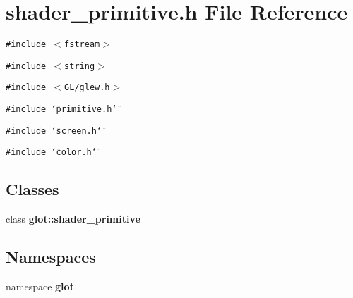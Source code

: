 \section{shader\_\-primitive.h File Reference}
\label{shader__primitive_8h}
{\tt \#include $<$fstream$>$}\par
{\tt \#include $<$string$>$}\par
{\tt \#include $<$GL/glew.h$>$}\par
{\tt \#include \char`\"{}primitive.h\char`\"{}}\par
{\tt \#include \char`\"{}screen.h\char`\"{}}\par
{\tt \#include \char`\"{}color.h\char`\"{}}\par
\subsection*{Classes}
\begin{CompactItemize}
\item 
class {\bf glot::shader\_\-primitive}
\end{CompactItemize}
\subsection*{Namespaces}
\begin{CompactItemize}
\item 
namespace {\bf glot}
\end{CompactItemize}

